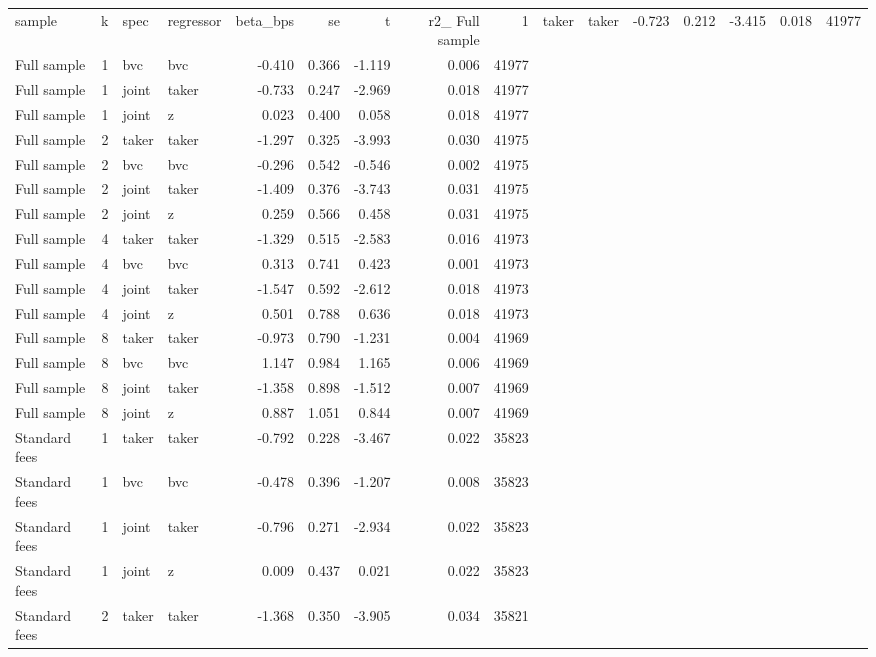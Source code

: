 \begin{tabular}{lrllrrrrr}
\toprule
sample & k & spec & regressor & beta_bps & se & t & r2_%
\midrule
Full sample & 1 & taker & taker & -0.723 & 0.212 & -3.415 & 0.018 & 41977 \\
Full sample & 1 & bvc & bvc & -0.410 & 0.366 & -1.119 & 0.006 & 41977 \\
Full sample & 1 & joint & taker & -0.733 & 0.247 & -2.969 & 0.018 & 41977 \\
Full sample & 1 & joint & z & 0.023 & 0.400 & 0.058 & 0.018 & 41977 \\
Full sample & 2 & taker & taker & -1.297 & 0.325 & -3.993 & 0.030 & 41975 \\
Full sample & 2 & bvc & bvc & -0.296 & 0.542 & -0.546 & 0.002 & 41975 \\
Full sample & 2 & joint & taker & -1.409 & 0.376 & -3.743 & 0.031 & 41975 \\
Full sample & 2 & joint & z & 0.259 & 0.566 & 0.458 & 0.031 & 41975 \\
Full sample & 4 & taker & taker & -1.329 & 0.515 & -2.583 & 0.016 & 41973 \\
Full sample & 4 & bvc & bvc & 0.313 & 0.741 & 0.423 & 0.001 & 41973 \\
Full sample & 4 & joint & taker & -1.547 & 0.592 & -2.612 & 0.018 & 41973 \\
Full sample & 4 & joint & z & 0.501 & 0.788 & 0.636 & 0.018 & 41973 \\
Full sample & 8 & taker & taker & -0.973 & 0.790 & -1.231 & 0.004 & 41969 \\
Full sample & 8 & bvc & bvc & 1.147 & 0.984 & 1.165 & 0.006 & 41969 \\
Full sample & 8 & joint & taker & -1.358 & 0.898 & -1.512 & 0.007 & 41969 \\
Full sample & 8 & joint & z & 0.887 & 1.051 & 0.844 & 0.007 & 41969 \\
Standard fees & 1 & taker & taker & -0.792 & 0.228 & -3.467 & 0.022 & 35823 \\
Standard fees & 1 & bvc & bvc & -0.478 & 0.396 & -1.207 & 0.008 & 35823 \\
Standard fees & 1 & joint & taker & -0.796 & 0.271 & -2.934 & 0.022 & 35823 \\
Standard fees & 1 & joint & z & 0.009 & 0.437 & 0.021 & 0.022 & 35823 \\
Standard fees & 2 & taker & taker & -1.368 & 0.350 & -3.905 & 0.034 & 35821 \\

\end{tabular}
